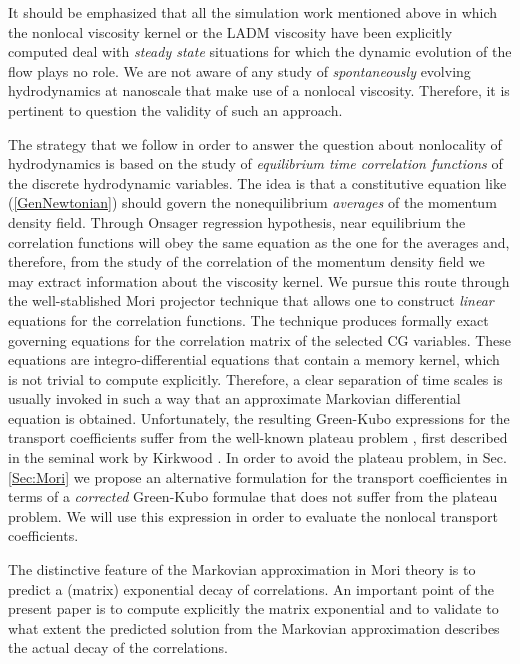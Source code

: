 \documentclass[a4paper,openright,12pt]{book}
\begin{document}
It should be  emphasized that all the simulation  work mentioned above
in which  the nonlocal  viscosity kernel or  the LADM  viscosity have
been explicitly  computed deal  with \textit{steady  state} situations
for which the dynamic evolution of the  flow plays no role. We are not
aware of any study of \textit{spontaneously} evolving hydrodynamics at
nanoscale that  make use  of a nonlocal  viscosity. Therefore,  it is
pertinent to question the validity of such an approach.

The strategy  that we follow in  order to answer
the question about nonlocality of hydrodynamics is based on the study
of  \textit{equilibrium time  correlation functions}  of the  discrete
hydrodynamic variables.  The idea is that a constitutive equation like
(\ref{GenNewtonian})     should     govern     the     nonequilibrium
\textit{averages}  of the  momentum  density  field.  Through  Onsager
regression hypothesis, near equilibrium the correlation functions will
obey the  same equation as  the one  for the averages  and, therefore,
from the study of the correlation of the momentum density field we may
extract information about the viscosity  kernel.  We pursue this route
through the  well-stablished Mori projector technique  that allows one
to construct \textit{linear} equations  for the correlation functions.
The  technique produces  formally  exact governing  equations for  the
correlation matrix of the selected  CG variables.  These equations are
integro-differential equations that contain  a memory kernel, which is
not trivial to  compute explicitly.  Therefore, a  clear separation of
time  scales is  usually invoked  in such  a way  that an  approximate
Markovian  differential  equation  is  obtained.   Unfortunately,  the
resulting Green-Kubo expressions for the transport coefficients suffer
from   the  well-known   plateau  problem   \cite{Espanol1998},  first
described in the seminal work by Kirkwood \cite{Kirkwood1949}. In order to avoid the plateau problem, in Sec. \ref{Sec:Mori} we propose an alternative formulation for the transport coefficientes in terms of a  \textit{corrected} Green-Kubo formulae that
does  not suffer  from the  plateau problem. We will use this expression  in order to evaluate the nonlocal
transport coefficients.

The distinctive feature of the  Markovian approximation in Mori theory
is  to  predict  a  (matrix) exponential  decay  of  correlations.  An
important  point of  the present  paper is  to compute  explicitly the
matrix  exponential  and to  validate  to  what extent  the  predicted
solution from  the Markovian approximation describes  the actual decay
of the correlations.
\end{document}
